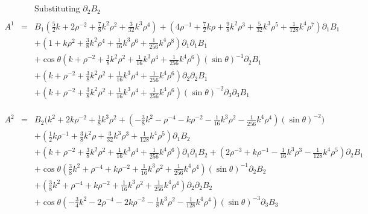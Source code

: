 \documentclass[10pt,letterpaper]{article}
\numberwithin{equation}{section}
\begin{document}
\begin{eqnarray}
\\ \nonumber\\
&&\text{Substituting $\partial_2 B_2$}
\\ \nonumber\\
A^{1}&=& B_{1} (\tfrac{5}{2} k + 2 \rho^{-2} + \tfrac{7}{8} k^2 \rho^2 + \tfrac{3}{32} k^3 \rho^4) + (4 \rho^{-1} + \tfrac{7}{2} k \rho + \tfrac{9}{8} k^2 \rho^3 + \tfrac{5}{32} k^3 \rho^5 + \tfrac{1}{128} k^4 \rho^7) \partial_{1}B_{1} \nonumber \\ 
&& + (1 + k \rho^2 + \tfrac{3}{8} k^2 \rho^4 + \tfrac{1}{16} k^3 \rho^6 + \tfrac{1}{256} k^4 \rho^8) \partial_{1}\partial_{1}B_{1} \nonumber \\ 
&& + \cos\theta (k + \rho^{-2} + \tfrac{3}{8} k^2 \rho^2 + \tfrac{1}{16} k^3 \rho^4 + \tfrac{1}{256} k^4 \rho^6) (\sin\theta)^{-1} \partial_{2}B_{1} \nonumber \\ 
&& + (k + \rho^{-2} + \tfrac{3}{8} k^2 \rho^2 + \tfrac{1}{16} k^3 \rho^4 + \tfrac{1}{256} k^4 \rho^6) \partial_{2}\partial_{2}B_{1} \nonumber \\ 
&& + (k + \rho^{-2} + \tfrac{3}{8} k^2 \rho^2 + \tfrac{1}{16} k^3 \rho^4 + \tfrac{1}{256} k^4 \rho^6) (\sin\theta)^{-2} \partial_{3}\partial_{3}B_{1}
\\ \nonumber\\
\\ \nonumber\\
A^{2}&=& B_{2} \bigl(k^2 + 2 k \rho^{-2} + \tfrac{1}{8} k^3 \rho^2 + (- \tfrac{3}{8} k^2 -  \rho^{-4} -  k \rho^{-2} -  \tfrac{1}{16} k^3 \rho^2 -  \tfrac{1}{256} k^4 \rho^4) (\sin\theta)^{-2}\bigr) \nonumber \\ 
&& + (\tfrac{1}{2} k \rho^{-1} + \tfrac{3}{8} k^2 \rho + \tfrac{3}{32} k^3 \rho^3 + \tfrac{1}{128} k^4 \rho^5) \partial_{1}B_{2} \nonumber \\ 
&& + (k + \rho^{-2} + \tfrac{3}{8} k^2 \rho^2 + \tfrac{1}{16} k^3 \rho^4 + \tfrac{1}{256} k^4 \rho^6) \partial_{1}\partial_{1}B_{2} + (2 \rho^{-3} + k \rho^{-1} -  \tfrac{1}{16} k^3 \rho^3 -  \tfrac{1}{128} k^4 \rho^5) \partial_{2}B_{1} \nonumber \\ 
&& + \cos\theta (\tfrac{3}{8} k^2 + \rho^{-4} + k \rho^{-2} + \tfrac{1}{16} k^3 \rho^2 + \tfrac{1}{256} k^4 \rho^4) (\sin\theta)^{-1} \partial_{2}B_{2} \nonumber \\ 
&& + (\tfrac{3}{8} k^2 + \rho^{-4} + k \rho^{-2} + \tfrac{1}{16} k^3 \rho^2 + \tfrac{1}{256} k^4 \rho^4) \partial_{2}\partial_{2}B_{2} \nonumber \\ 
&& + \cos\theta (- \tfrac{3}{4} k^2 - 2 \rho^{-4} - 2 k \rho^{-2} -  \tfrac{1}{8} k^3 \rho^2 -  \tfrac{1}{128} k^4 \rho^4) (\sin\theta)^{-3} \partial_{3}B_{3} \nonumber \\ 

\end{eqnarray}
\end{document}
